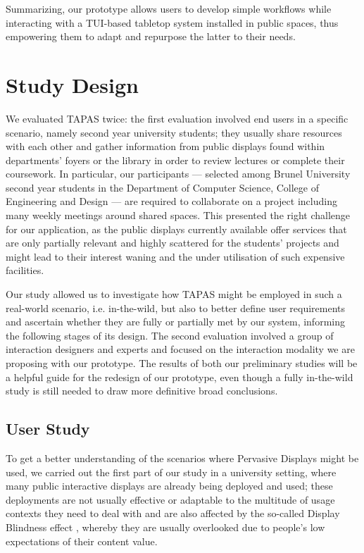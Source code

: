 Summarizing, our prototype allows users to develop simple workflows while interacting with a \ac{TUI}-based tabletop system installed in public spaces, thus empowering them to adapt and repurpose the latter to their needs.

\section{Study Design}
We evaluated \acs{TAPAS} twice: the first evaluation involved end users in a specific scenario, namely second year university students; they usually share resources with each other and gather information from public displays found within departments' foyers or the library in order to review lectures or complete their coursework. In particular, our participants --- selected among Brunel University second year students in the Department of Computer Science, College of Engineering and Design --- are required to collaborate on a project including many weekly meetings around shared spaces. This presented the right challenge for our application, as the public displays currently available offer services that are only partially relevant and highly scattered for the students' projects and might lead to their interest waning and the under utilisation of such expensive facilities.

Our study allowed us to investigate how \acs{TAPAS} might be employed in such a real-world scenario, i.e. in-the-wild, but also to better define user requirements and ascertain whether they are fully or partially met by our system, informing the following stages of its design. The second  evaluation involved a group of interaction designers and experts and focused on the interaction modality we are proposing with our prototype. The results of both our preliminary studies will be a helpful guide for the redesign of our prototype, even though a fully in-the-wild study is still needed to draw more definitive broad conclusions.

\subsection{User Study}
To get a better understanding of the scenarios where Pervasive Displays might be used, we carried out the first part of our study in a university setting, where many public interactive displays are already being deployed and used; these deployments are not usually effective or adaptable to the multitude of usage contexts they need to deal with and are also affected by the so-called Display Blindness effect \cite{Muller:2009wy}, whereby they are usually overlooked due to people's low expectations of their content value.


